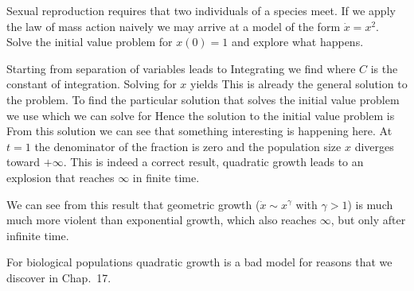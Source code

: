 \label{exGrowthQuadratic}
Sexual reproduction requires that two individuals of a species meet. If we apply the law of mass action naively we may arrive at a model of the form
$\dot{x}=x^2$. Solve the initial value problem for $x(0)=1$ and explore what happens. 

\solution
Starting from 
separation of variables leads to
Integrating we find 
where $C$ is the constant of integration. Solving for $x$ yields 
This is already the general solution to the problem. To find the particular solution that solves the initial value problem we use 
which we can solve for 
Hence the solution to the initial value problem is 
From this solution we can see that something interesting is happening here. At $t=1$ the denominator of the fraction is zero and the population size $x$ diverges toward $+\infty$. This is indeed a correct result, quadratic growth leads to an explosion that reaches $\infty$ in finite time. 

We can see from this result that geometric growth ($\dot{x}\sim x^\gamma$ with $\gamma>1$) is much much more violent than exponential growth, which also reaches $\infty$, but only after infinite time. 

For biological populations quadratic growth is a bad model for reasons that we discover in Chap.~17.  